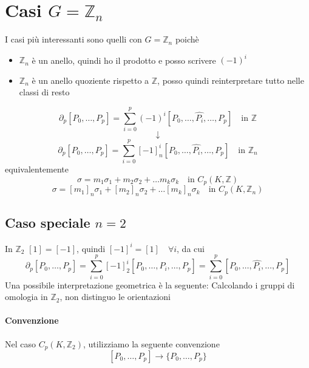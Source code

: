 \documentclass[a4paper]{report}
\newcommand{\Z}{\ensuremath{\mathbb{Z}}}
\begin{document}
\section{Casi $G=\Z_n$}
I casi più interessanti sono quelli con $G=\Z_n$ poichè
\begin{itemize}
    \item $\Z_n$ è un anello, quindi ho il prodotto e posso scrivere $(-1)^i$
    \item $\Z_n$ è un anello quoziente rispetto a $\Z$, posso quindi reinterpretare tutto nelle classi di resto
\end{itemize}
\[
    \partial_p[P_0,\dots,P_p]=\sum_{i=0}^p(-1)^i[P_0,\dots,\hat{P_i},\dots,P_p]\quad\text{in }\Z
\]
\[
    \downarrow
\]
\[
    \partial_p[P_0,\dots,P_p]=\sum_{i=0}^p[-1]^i_n[P_0,\dots,\hat{P_i},\dots,P_p]\quad\text{in }\Z_n
\]
equivalentemente
\[
    \sigma=m_1\sigma_1+m_2\sigma_2+\dots m_k\sigma_k\quad\text{in }C_p(K,\Z)
\]
\[
    \sigma=[m_1]_n\sigma_1+[m_2]_n\sigma_2+\dots [m_k]_n\sigma_k\quad\text{in }C_p(K,\Z_n)
\]
\subsection{Caso speciale $n=2$}
In $\Z_2$ $[1]=[-1]$, quindi $[-1]^i=[1]\quad\forall i$, da cui
\[
    \partial_p[P_0,\dots,P_p]=\sum_{i=0}^p[-1]_2^i[P_0,\dots,\hat{P_i},\dots,P_p]=\sum_{i=0}^p[P_0,\dots,\hat{P_i},\dots,P_p]
\]
Una possibile interpretazione geometrica è la seguente: Calcolando i gruppi di omologia in $\Z_2$, non distinguo le orientazioni
\paragraph{Convenzione} Nel caso $C_p(K,\Z_2)$, utilizziamo la seguente convenzione
\[
    [P_0,\dots,P_p]\longrightarrow\{P_0,\dots,P_p\}
\]
\end{document}
